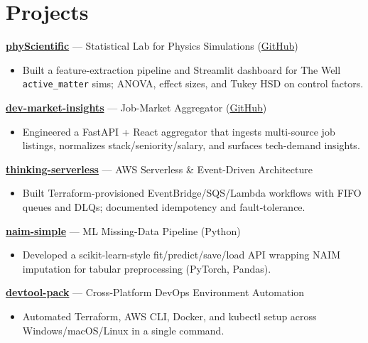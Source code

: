 \documentclass[10pt,a4paper]{article}
\begin{document}
\section*{Projects}

\textbf{\href{https://physcientific.onrender.com/}{phyScientific}} --- Statistical Lab for Physics Simulations (\href{https://github.com/Emilio-Gordillo-Esparragoza/phyScientific}{GitHub})\\
\begin{itemize}
    \item Built a feature-extraction pipeline and Streamlit dashboard for The Well \texttt{active\_matter} sims; ANOVA, effect sizes, and Tukey HSD on control factors.
\end{itemize}

\textbf{\href{https://dev-market-insights.vercel.app}{dev-market-insights}} --- Job-Market Aggregator (\href{https://github.com/Emilio-Gordillo-Esparragoza/dev-market-insights}{GitHub})\\
\begin{itemize}
    \item Engineered a FastAPI + React aggregator that ingests multi-source job listings, normalizes stack/seniority/salary, and surfaces tech-demand insights.
\end{itemize}

\textbf{\href{https://github.com/Emilio-Gordillo-Esparragoza/thinking-serverless}{thinking-serverless}} --- AWS Serverless \& Event-Driven Architecture\\
\begin{itemize}
    \item Built Terraform-provisioned EventBridge/SQS/Lambda workflows with FIFO queues and DLQs; documented idempotency and fault-tolerance.
\end{itemize}

\textbf{\href{https://github.com/Emilio-Gordillo-Esparragoza/naim-simple}{naim-simple}} --- ML Missing-Data Pipeline (Python)\\
\begin{itemize}
    \item Developed a scikit-learn-style fit/predict/save/load API wrapping NAIM imputation for tabular preprocessing (PyTorch, Pandas).
\end{itemize}

\textbf{\href{https://github.com/Emilio-Gordillo-Esparragoza/devtool-pack}{devtool-pack}} --- Cross-Platform DevOps Environment Automation\\
\begin{itemize}
    \item Automated Terraform, AWS CLI, Docker, and kubectl setup across Windows/macOS/Linux in a single command.
\end{itemize}
\end{document}
